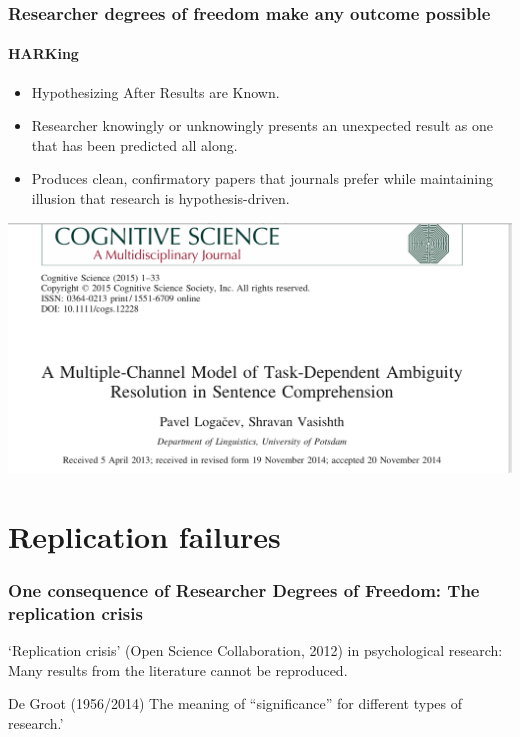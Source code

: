 \documentclass{beamer}
\begin{document}
\begin{frame}
\frametitle{Researcher degrees of freedom make any outcome possible}
\framesubtitle{HARKing}

\begin{itemize}
\item Hypothesizing After Results are Known.
\item Researcher knowingly or unknowingly presents an unexpected result as one that has been predicted all along. 
\item Produces clean, confirmatory papers that journals prefer while maintaining illusion that research is hypothesis-driven. 
\end{itemize}


\begin{center}
\includegraphics[scale=0.15]{logacevvasishth.png}
\end{center}

\end{frame}



\section{Replication failures}

\begin{frame}
\frametitle{One consequence of Researcher Degrees of Freedom: The replication crisis}

`Replication crisis' (Open Science Collaboration, 2012) in psychological research: Many results from the literature cannot be reproduced.\\[45pt]

\begin{small}
De Groot (1956/2014) The meaning of “significance” for different types of research.' %
\end{small}

\end{frame}
\end{document}
